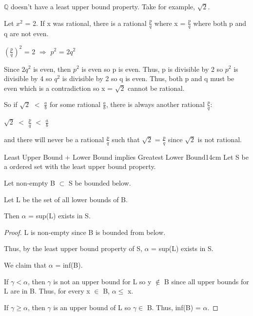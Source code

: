 	\begin{example}
		$\mathbb{Q}$ doesn't have a least upper bound property.
		Take for example, $\sqrt{2}$.

		Let $x^2$ = 2.
		If x was rational, there is a rational $\frac{p}{q}$
		where x = $\frac{p}{q}$ where both p and q are not even.

		\hspace{0.5cm}
		$(\frac{p}{q})^2$ = 2
		\hspace{1cm}
		$\Rightarrow$
		\hspace{1cm}
		$p^2$ = $2q^2$

		Since $2q^2$ is even, then $p^2$ is even so p is even.
		Thus, p is divisible by 2 so $p^2$ is divisible by 4
		so $q^2$ is divisible by 2 so q is even.
		Thus, both p and q must be even which is a contradiction
		so x = $\sqrt{2}$ cannot be rational. 
		
		So if $\sqrt{2}$ $<$ $\frac{a}{b}$
		for some rational $\frac{a}{b}$, there is always another
		rational $\frac{p}{q}$:

		\hspace{0.5cm}
		$\sqrt{2}$ $<$ $\frac{p}{q}$ $<$ $\frac{a}{b}$

		and there will never be a rational $\frac{p}{q}$ such that
		$\sqrt{2}$ = $\frac{p}{q}$ since $\sqrt{2}$ is not rational.
	\end{example}

	\vspace{0.5cm}


	
	\begin{wtheorem}{Least Upper Bound + Lower Bound
	implies Greatest Lower Bound}{14cm}
		Let S be a ordered set with the least upper bound property.

		Let non-empty B $\subset$ S be bounded below.

		Let L be the set of all lower bounds of B.

		Then $\alpha$ = sup(L) exists in S.		
	\end{wtheorem}

	\begin{proof}
		L is non-empty since B is bounded from below.

		Thus, by the least upper bound property of S, $\alpha$ = sup(L) exists in S.

		We claim that $\alpha$ = inf(B).

		If $\gamma < \alpha$, then $\gamma$ is not an upper bound for L
		so y $\not \in$ B since all upper bounds for L are in B.
		Thus, for every x $\in$ B, $\alpha \leq$ x.

		If $\gamma \geq \alpha$, then $\gamma$ is an upper bound of L
		so $\gamma \in$ B.
		Thus, inf(B) = $\alpha$.
	\end{proof}

